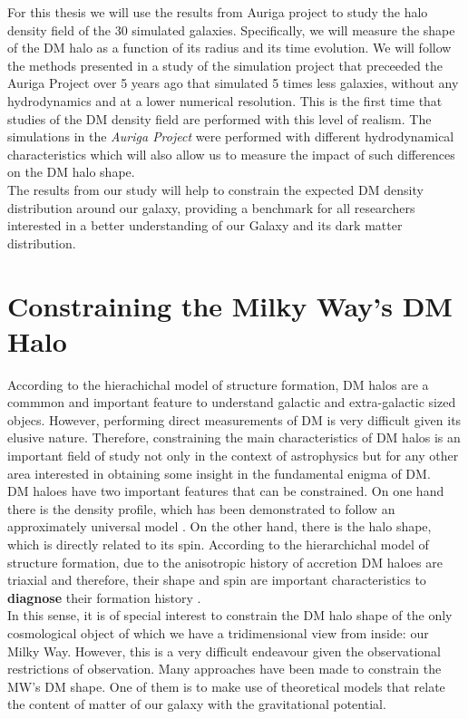 For this thesis we will use the results from Auriga project \cite{auriga} to study the halo density field of the 30 simulated galaxies.
Specifically, we will measure the shape of the DM halo as a function of its radius and its time evolution.
We will follow the methods presented in a study of the simulation project that preceeded the Auriga Project over 5 years ago \cite{Vera-Ciro2011} that simulated 5 times less galaxies, without any hydrodynamics and at a lower numerical resolution. 
This is the first time that studies of the DM density field are performed with this level of realism.
The simulations in the \emph{Auriga Project} were performed with different hydrodynamical characteristics 
which will also allow us to measure the impact of such differences on the DM halo shape.\\

The results from our study will help to constrain the expected DM density distribution around our galaxy, 
providing a benchmark for all researchers interested in a better understanding of our Galaxy and its 
dark matter distribution.

\section{Constraining the Milky Way's DM Halo}
According to the hierachichal model of structure formation, DM halos are a commmon and important feature to understand galactic and extra-galactic sized objecs. However, performing direct measurements of DM is very difficult given its elusive nature. Therefore, constraining the main characteristics of DM halos is an important field of study not only in the context of astrophysics but for any other area interested in obtaining some insight in the fundamental enigma of DM.\\

DM haloes have two important features that can be constrained. On one hand there is the density profile, which has been demonstrated to follow an approximately universal model \cite{Navarro et al. 2010}. On the other hand, there is the halo shape, which is directly related to its spin. According to the hierarchichal model of structure formation, due to the anisotropic history of accretion DM haloes are triaxial and therefore, their shape and spin are important characteristics to \textbf{diagnose} their formation history \cite{Bardeen et al. 1986}.\\

In this sense, it is of special interest to constrain the DM halo shape of the only cosmological object of which we have a tridimensional view from inside: our Milky Way. However, this is a very difficult endeavour given the observational restrictions of observation. Many approaches have been made to constrain the MW's DM shape. One of them is to make use of theoretical models that relate the content of matter of our galaxy with the gravitational potential.\\


